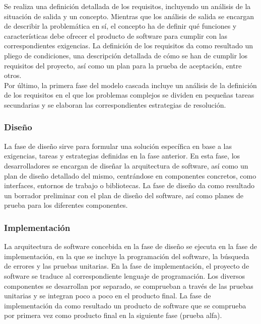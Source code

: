 Se realiza una definición detallada de los requisitos, incluyendo un análisis de la situación de salida y un concepto. Mientras que los análisis de salida se encargan de describir la problemática en sí, el concepto ha de definir qué funciones y características debe ofrecer el producto de software para cumplir con las correspondientes exigencias. La definición de los requisitos da como resultado un pliego de condiciones, una descripción detallada de cómo se han de cumplir los requisitos del proyecto, así como un plan para la prueba de aceptación, entre otros.\\

Por último, la primera fase del modelo cascada incluye un análisis de la definición de los requisitos en el que los problemas complejos se dividen en pequeñas tareas secundarias y se elaboran las correspondientes estrategias de resolución.\\

\subsubsection{Diseño}

La fase de diseño sirve para formular una solución específica en base a las exigencias, tareas y estrategias definidas en la fase anterior. En esta fase, los desarrolladores se encargan de diseñar la arquitectura de software, así como un plan de diseño detallado del mismo, centrándose en componentes concretos, como interfaces, entornos de trabajo o bibliotecas. La fase de diseño da como resultado un borrador preliminar con el plan de diseño del software, así como planes de prueba para los diferentes componentes.\\

\subsubsection{Implementación}

La arquitectura de software concebida en la fase de diseño se ejecuta en la fase de implementación, en la que se incluye la programación del software, la búsqueda de errores y las pruebas unitarias. En la fase de implementación, el proyecto de software se traduce al correspondiente lenguaje de programación. Los diversos componentes se desarrollan por separado, se comprueban a través de las pruebas unitarias y se integran poco a poco en el producto final. La fase de implementación da como resultado un producto de software que se comprueba por primera vez como producto final en la siguiente fase (prueba alfa).\\

